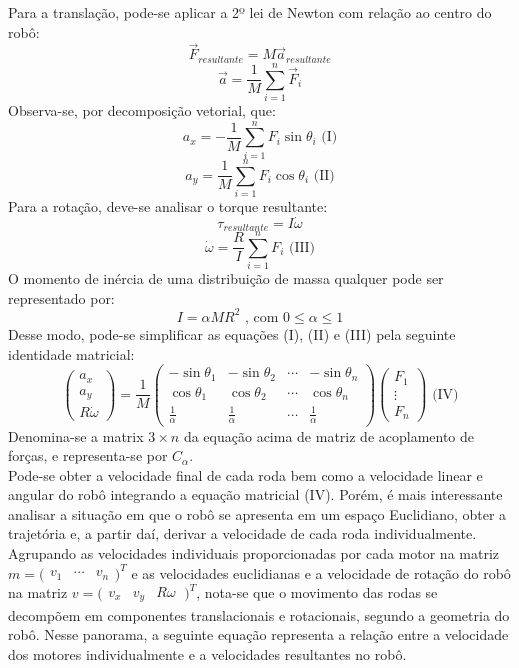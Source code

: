 \documentclass{article}
\begin{document}
Para a translação, pode-se aplicar a 2º lei de Newton com relação ao centro do robô:
\[\vec{F}_{resultante} = M\vec{a}_{resultante}\]
\[\vec{a}=\frac{1}{M}\sum_{i=1}^{n}\vec{F}_i\]
Observa-se, por decomposição vetorial, que:
\[a_x=-\frac{1}{M}\sum_{i=1}^{n}F_i\sin\theta_i \text{ (I)}  \]     
\[a_y=\frac{1}{M}\sum_{i=1}^{n}F_i\cos\theta_i \text{ (II)}\]	
Para a rotação, deve-se analisar o torque resultante:
\[\tau_{resultante}=I\dot{\omega}\]
\[\dot{\omega}=\frac{R}{I}\sum_{i=1}^{n}F_i \text{ (III)}\]
O momento de inércia de uma distribuição de massa qualquer pode ser representado por:
\[I=\alpha MR^2\text{ , com } 0\leq\alpha\leq1\]
Desse modo, pode-se simplificar as equações (I), (II) e (III) pela seguinte identidade matricial:
\[
\begin{pmatrix}a_{x}\\a_{y}\\R\dot{\omega} \end{pmatrix}
=\frac{1}{M}
\begin{pmatrix}
  -\sin\theta_1 & -\sin\theta_2 & \cdots & -\sin\theta_n \\
  \cos\theta_1 & \cos\theta_2 & \cdots & \cos\theta_n \\
  \frac{1}{\alpha} & \frac{1}{\alpha} &\cdots & \frac{1}{\alpha}
 \end{pmatrix}
\begin{pmatrix}F_{1}\\ \vdots \\ F_{n} \end{pmatrix} \text{ (IV)}
\]
Denomina-se a matrix $3 \times n$ da equação acima de matriz de acoplamento de forças, e representa-se por \( C_\alpha \). \\
Pode-se obter a velocidade final de cada roda bem como a velocidade linear e angular do robô integrando a equação matricial (IV). Porém, é mais interessante analisar a situação em que o robô se apresenta em um espaço Euclidiano, obter a trajetória e, a partir daí, derivar a velocidade de cada roda individualmente.\\
Agrupando as velocidades individuais proporcionadas por cada motor na matriz $m=\bigl(\begin{smallmatrix}v_{1}&\cdots&v_{n} \end{smallmatrix})^T$ e as velocidades euclidianas e a velocidade de rotação do robô na matriz  $v=\bigl(\begin{smallmatrix}v_{x}&v_{y}&R{\omega}\ \end{smallmatrix})^T$, nota-se que o movimento das rodas se decompõem em componentes translacionais e rotacionais, segundo a geometria do robô. Nesse panorama, a seguinte equação representa a relação entre a velocidade dos motores individualmente e a velocidades resultantes no robô.
\end{document}
